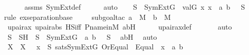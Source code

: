 \begin{isabellebody}
\ \ \ \ \isamarkupfalse%
\ assms\ SymExt{\isacharunderscore}{\kern0pt}def\isanewline
\ \ \ \ \isamarkupfalse%
\ auto\isanewline
\ \ \isamarkupfalse%
\ {\isachardoublequoteopen}{\isasymexists}S\ {\isasymin}\ SymExt{\isacharparenleft}{\kern0pt}G{\isacharparenright}{\kern0pt}{\isachardot}{\kern0pt}\ {\isacharbraceleft}{\kern0pt}\ val{\isacharparenleft}{\kern0pt}G{\isacharcomma}{\kern0pt}\ x{\isacharparenright}{\kern0pt}{\isachardot}{\kern0pt}\ x\ {\isasymin}\ {\isacharbraceleft}{\kern0pt}a{\isacharprime}{\kern0pt}{\isacharcomma}{\kern0pt}\ b{\isacharprime}{\kern0pt}{\isacharbraceright}{\kern0pt}\ {\isacharbraceright}{\kern0pt}\ {\isasymsubseteq}\ S{\isachardoublequoteclose}\isanewline
\ \ \ \ \isamarkupfalse%
{\isacharparenleft}{\kern0pt}rule\ ex{\isacharunderscore}{\kern0pt}separation{\isacharunderscore}{\kern0pt}base{\isacharparenright}{\kern0pt}\isanewline
\ \ \ \ \isamarkupfalse%
{\isacharparenleft}{\kern0pt}subgoal{\isacharunderscore}{\kern0pt}tac\ {\isachardoublequoteopen}a{\isacharprime}{\kern0pt}\ {\isasymin}\ M\ {\isasymand}\ b{\isacharprime}{\kern0pt}\ {\isasymin}\ M{\isachardoublequoteclose}{\isacharparenright}{\kern0pt}\isanewline
\ \ \ \ \isamarkupfalse%
\ upair{\isacharunderscore}{\kern0pt}ax\ upair{\isacharunderscore}{\kern0pt}abs\ HS{\isacharunderscore}{\kern0pt}iff\ P{\isacharunderscore}{\kern0pt}name{\isacharunderscore}{\kern0pt}in{\isacharunderscore}{\kern0pt}M\ a{\isacharprime}{\kern0pt}b{\isacharprime}{\kern0pt}H\isanewline
\ \ \ \ \isamarkupfalse%
\ upair{\isacharunderscore}{\kern0pt}ax{\isacharunderscore}{\kern0pt}def\ \isanewline
\ \ \ \ \isamarkupfalse%
\ auto\isanewline
\ \ \isamarkupfalse%
\ \isamarkupfalse%
\ S\ \ SH\ {\isacharcolon}{\kern0pt}\ {\isachardoublequoteopen}S\ {\isasymin}\ SymExt{\isacharparenleft}{\kern0pt}G{\isacharparenright}{\kern0pt}{\isachardoublequoteclose}\ {\isachardoublequoteopen}{\isacharbraceleft}{\kern0pt}\ a{\isacharcomma}{\kern0pt}\ b\ {\isacharbraceright}{\kern0pt}\ {\isasymsubseteq}\ S{\isachardoublequoteclose}\ \isamarkupfalse%
\ a{\isacharprime}{\kern0pt}b{\isacharprime}{\kern0pt}H\ \isamarkupfalse%
\ auto\isanewline
\isanewline
\ \ \isamarkupfalse%
\ X\ \ {\isachardoublequoteopen}X\ {\isasymequiv}\ {\isacharbraceleft}{\kern0pt}\ x\ {\isasymin}\ S{\isachardot}{\kern0pt}\ sats{\isacharparenleft}{\kern0pt}SymExt{\isacharparenleft}{\kern0pt}G{\isacharparenright}{\kern0pt}{\isacharcomma}{\kern0pt}\ Or{\isacharparenleft}{\kern0pt}Equal{\isacharparenleft}{\kern0pt}{}{\isacharcomma}{\kern0pt}\ {}{\isacharparenright}{\kern0pt}{\isacharcomma}{\kern0pt}\ Equal{\isacharparenleft}{\kern0pt}{}{\isacharcomma}{\kern0pt}\ {}{\isacharparenright}{\kern0pt}{\isacharparenright}{\kern0pt}{\isacharcomma}{\kern0pt}\ {\isacharbrackleft}{\kern0pt}x{\isacharbrackright}{\kern0pt}\ {\isacharat}{\kern0pt}\ {\isacharbrackleft}{\kern0pt}a{\isacharcomma}{\kern0pt}\ b{\isacharbrackright}{\kern0pt}\ {\isacharparenright}{\kern0pt}\ {\isacharbraceright}{\kern0pt}{\isachardoublequoteclose}\ \isanewline

\end{isabellebody}
